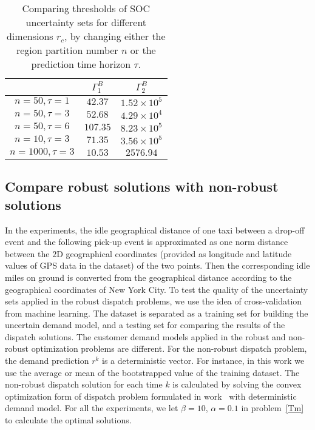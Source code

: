 \documentclass[10pt,twocolumn,twoside,english]{IEEEtran}
\begin{document}
\begin{table}[t!]
\centering
\begin{tabular}{|c|c|c|}
  \hline
                      &           $\Gamma_1^B$           & $\Gamma_2^B$ \\ \hline
$n=50, \tau=1$                       &$42.37$         &$1.52 \times 10^5$ \\ \hline
$n=50, \tau=3$                       & $52.68$       & $4.29\times 10^4$   \\ \hline
$n=50, \tau=6$                       & $107.35$     &$8.23 \times 10^5$    \\ \hline
$n=10, \tau=3$                       & $71.35$      & $ 3.56\times 10^5$    \\ \hline
$n=1000, \tau=3$                   & $10.53$       &$2576.94$    \\ \hline
\end{tabular}
     \caption{Comparing thresholds of SOC uncertainty sets for different dimensions $r_c$, by changing either the region partition number $n$ or the prediction time horizon $\tau$.}\label{table_nt}
\vspace{-20pt}
\end{table}




\subsection{Compare robust solutions with non-robust solutions}
In the experiments,  the idle geographical distance of one taxi between a drop-off event and the following pick-up event is approximated as one norm distance between the $2$D geographical coordinates (provided as longitude and latitude values of GPS data in the dataset) of the two points. Then the corresponding idle miles on ground is converted from the geographical distance according to the geographical coordinates of New York City. To test the quality of the uncertainty sets applied in the robust dispatch problems, we use the idea of cross-validation from machine learning. The dataset is separated as a training set for building the uncertain demand model, and a testing set for comparing the results of the dispatch solutions. The customer demand models applied in the robust and non-robust optimization problems are different. For the non-robust dispatch problem, the demand prediction $r^k$ is a deterministic vector. For instance, in this work we use the average or mean of the bootstrapped value of the training dataset. The non-robust dispatch solution for each time $k$ is calculated by solving the convex optimization form of dispatch problem formulated in work~\cite{taxi_Feiiccps15, Miao_tase16} with deterministic demand model. For all the experiments, we let $\beta=10$, $\alpha=0.1$ in problem~\eqref{Tm} to calculate the optimal solutions.
\end{document}
